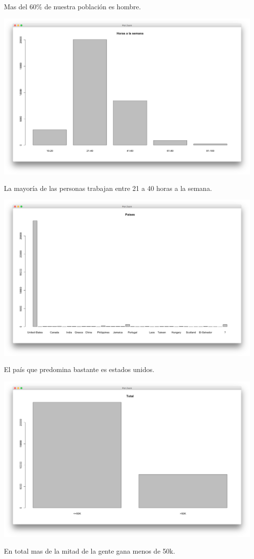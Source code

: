 \documentclass{article}
\begin{document}
  Mas del 60\% de nuestra población es hombre.
  \begin{center}
    \hbox{\hspace{-5.5em}\includegraphics[scale=0.4]{graficas/hpwP}}
  \end{center}
  La mayoría de las personas trabajan entre 21 a 40 horas a la semana.
  \begin{center}
    \hbox{\hspace{-5.5em}\includegraphics[scale=0.4]{graficas/paisesP}}
  \end{center}
  El país que predomina bastante es estados unidos.
  \begin{center}
    \hbox{\hspace{-5.5em}\includegraphics[scale=0.4]{graficas/totalP}}
  \end{center}
  En total mas de la mitad de la gente gana menos de 50k.
\end{document}

